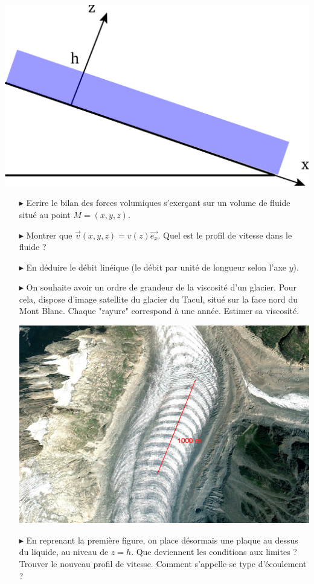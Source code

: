 \documentclass{report}
\begin{document}
\begin{center}
	\includegraphics[scale=0.3]{ecoulement.pdf}
\end{center}

\begin{itemize}

	\item[$\blacktriangleright$] Ecrire le bilan des forces volumiques s'exerçant sur un volume de fluide situé au point $M=(x,y,z)$.
	\item[$\blacktriangleright$] Montrer que $\vec{v}(x,y,z)=v(z)\vec{e_x}$. Quel est le profil de vitesse dans le fluide ? 
	\item[$\blacktriangleright$] En déduire le débit linéique (le débit par unité de longueur selon l'axe $y$).
	\item[$\blacktriangleright$] On souhaite avoir un ordre de grandeur de la viscosité d'un glacier. Pour cela, dispose d'image satellite du glacier du Tacul, situé sur la face nord du Mont Blanc. Chaque "rayure" correspond à une année. Estimer sa viscosité. 
	
\begin{center}
	\includegraphics[scale=1]{glacier.png}
\end{center}


	\item[$\blacktriangleright$] En reprenant la première figure, on place désormais une plaque au dessus du liquide, au niveau de $z=h$. Que deviennent les conditions aux limites ? Trouver le nouveau profil de vitesse. Comment s'appelle se type d'écoulement ?

\end{itemize}
\end{document}
